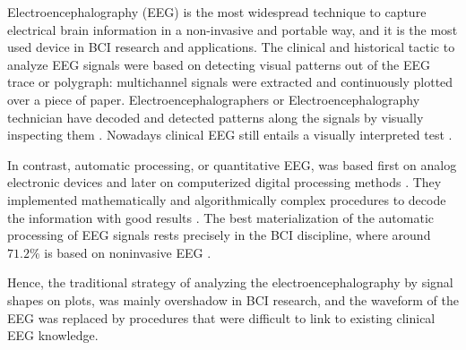 


Electroencephalography (EEG) is the most widespread technique to capture electrical brain information in a non-invasive and portable way, and it is the most used device in BCI research and applications.  The clinical and historical tactic to analyze EEG signals were based on detecting visual patterns out of the EEG trace or polygraph\cite{Hartman2005}: multichannel signals were extracted and continuously plotted over a piece of paper. Electroencephalographers or Electroencephalography technician have decoded and detected patterns along the signals by visually inspecting them \cite{Schomer2010}.   Nowadays clinical EEG still entails a visually interpreted test \cite{Hartman2005}.

In contrast, automatic processing, or quantitative EEG, was based first on analog electronic devices and later on computerized digital processing methods \cite{Jansen1991}.  They implemented mathematically and algorithmically complex procedures to decode the information with good results \cite{Yuste2017}.  The best materialization of the automatic processing of EEG signals rests precisely in the BCI discipline, where around $71.2\%$ is based on noninvasive EEG \cite{Guger2017}.  


Hence, the traditional strategy of analyzing the electroencephalography by signal shapes on plots, was mainly overshadow in BCI research, and the waveform of the EEG was replaced by procedures that were difficult to link to existing clinical EEG knowledge.  

